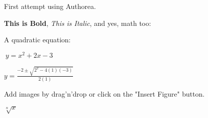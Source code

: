 First attempt using Authorea.

\textbf{This is Bold}, \textit{This is Italic}, and yes, math too:

A quadratic equation:

$\ y = x^{2} + 2x -3 $


$ y = \frac{-2 \pm \sqrt{2^{2}-4(1)(-3)}}{2(1)}$

Add images by drag'n'drop or click on the "Insert Figure" button.

$\sqrt[n]{x}$